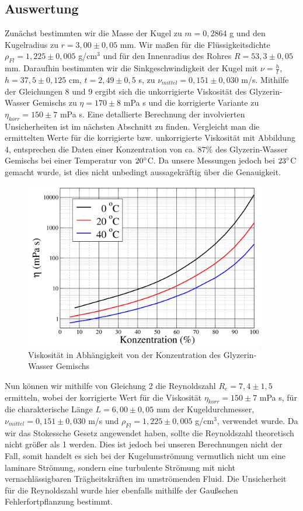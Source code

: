 \documentclass{article}
\begin{document}
\subsection{Auswertung}
Zunächst bestimmten wir die Masse der Kugel zu $m=0,2864$ g und den Kugelradius zu $r = 3,00 \pm 0,05$ mm.
Wir maßen für die Flüssigkeitsdichte $\rho_{Fl} = 1,225 \pm 0,005 $ g/cm$^3$ und für den Innenradius des Rohres $R= 53,3 \pm 0,05$ mm.
Daraufhin bestimmten wir die Sinkgeschwindigkeit der Kugel mit $\nu = \frac{h}{t} $, $h=37,5 \pm 0,125$ cm, $t=2,49 \pm 0,5$ s,  zu $\nu_{mittel} = 0,151 \pm 0,030 $ m/s. Mithilfe der Gleichungen 8 und 9 ergibt sich die unkorrigierte Viskosität des Glyzerin-Wasser Gemischs zu $\eta = 170 \pm 8 $ mPa s und die korrigierte Variante zu $\eta_{korr} = 150 \pm 7 $ mPa s. Eine detallierte Berechnung der involvierten Unsicherheiten ist im nächsten Abschnitt zu finden.
Vergleicht man die ermittelten Werte für die korrigierte bzw. unkorrigierte Viskosität mit Abbildung 4, entsprechen die Daten einer Konzentration von ca. $87\%$ des Glyzerin-Wasser Gemischs bei einer Temperatur von $20\degree$C. Da unsere Messungen jedoch bei $23 \degree$C gemacht wurde, ist dies nicht unbedingt aussagekräftig über die Genauigkeit.
\begin{figure}[H]
\centering
\includegraphics[width=300pt]{vis-konzentration.png}
\caption{Viskosität in Abhängigkeit von der Konzentration des Glyzerin-Wasser Gemischs \cite{1}}
\label{fig:length_eight_mouse}
\end{figure}
\noindent
Nun können wir mithilfe von Gleichung 2 die Reynoldszahl $R_e = 7,4 \pm 1,5 $ ermitteln, wobei der korrigierte Wert für die Viskosität $\eta_{korr} = 150 \pm 7$ mPa s, für die charakterische Länge $L = 6,00 \pm 0,05$ mm der Kugeldurchmesser, $\nu_{mittel}= 0,151 \pm 0,030$ m/s und $\rho_{Fl} = 1,225 \pm 0,005 $ g/cm$^3$, verwendet wurde. Da wir das Stokessche Gesetz angewendet haben, sollte die Reynoldszahl theoretisch nicht größer als 1 werden. Dies ist jedoch bei unseren Berechnungen nicht der Fall, somit handelt es sich bei der Kugelumströmung vermutlich nicht um eine laminare Strömung, sondern eine turbulente Strömung mit nicht vernachlässigbaren Trägheitskräften im umströmenden Fluid. Die Unsicherheit für die Reynoldszahl wurde hier ebenfalls mithilfe der Gaußschen Fehlerfortpflanzung bestimmt.
\end{document}
